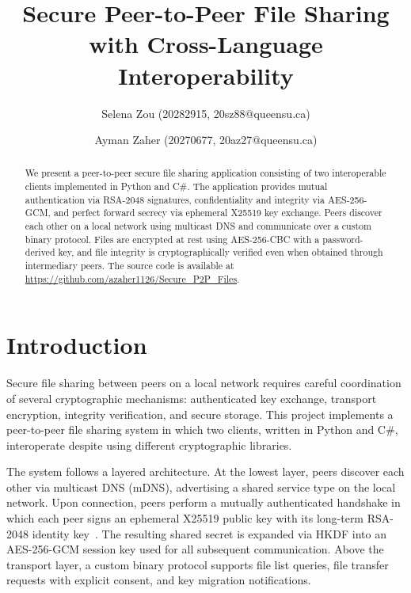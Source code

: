 \documentclass[sigconf,nonacm]{acmart}
\begin{document}
\title{Secure Peer-to-Peer File Sharing with Cross-Language Interoperability}

\author{Selena Zou (20282915, 20sz88@queensu.ca)}
\author{Ayman Zaher (20270677, 20az27@queensu.ca)}

\begin{abstract}
We present a peer-to-peer secure file sharing application consisting of two interoperable clients implemented in Python and C\#.
The application provides mutual authentication via RSA-2048 signatures, confidentiality and integrity via AES-256-GCM, and perfect forward secrecy via ephemeral X25519 key exchange.
Peers discover each other on a local network using multicast DNS and communicate over a custom binary protocol.
Files are encrypted at rest using AES-256-CBC with a password-derived key, and file integrity is cryptographically verified even when obtained through intermediary peers.
The source code is available at \url{https://github.com/azaher1126/Secure_P2P_Files}.
\end{abstract}

\maketitle

\section{Introduction}

Secure file sharing between peers on a local network requires careful coordination of several cryptographic mechanisms: authenticated key exchange, transport encryption, integrity verification, and secure storage.
This project implements a peer-to-peer file sharing system in which two clients, written in Python and C\#, interoperate despite using different cryptographic libraries.

The system follows a layered architecture.
At the lowest layer, peers discover each other via multicast DNS (mDNS), advertising a shared service type on the local network.
Upon connection, peers perform a mutually authenticated handshake in which each peer signs an ephemeral X25519 public key with its long-term RSA-2048 identity key~\cite{paar2024, alaca2026}.
The resulting shared secret is expanded via HKDF into an AES-256-GCM session key used for all subsequent communication.
Above the transport layer, a custom binary protocol supports file list queries, file transfer requests with explicit consent, and key migration notifications.
\end{document}
